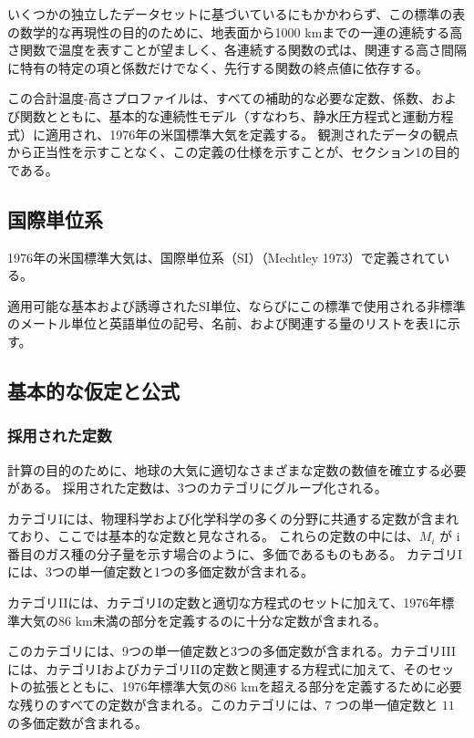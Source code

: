 \documentclass{article}
\begin{document}
いくつかの独立したデータセットに基づいているにもかかわらず、この標準の表の数学的な再現性の目的のために、地表面から1000 kmまでの一連の連続する高さ関数で温度を表すことが望ましく、各連続する関数の式は、関連する高さ間隔に特有の特定の項と係数だけでなく、先行する関数の終点値に依存する。

この合計温度-高さプロファイルは、すべての補助的な必要な定数、係数、および関数とともに、基本的な連続性モデル（すなわち、静水圧方程式と運動方程式）に適用され、1976年の米国標準大気を定義する。
観測されたデータの観点から正当性を示すことなく、この定義の仕様を示すことが、セクション1の目的である。

\subsection{国際単位系}

1976年の米国標準大気は、国際単位系（SI）（Mechtley 1973）で定義されている。

適用可能な基本および誘導されたSI単位、ならびにこの標準で使用される非標準のメートル単位と英語単位の記号、名前、および関連する量のリストを表1に示す。

\subsection{基本的な仮定と公式}
\subsubsection{採用された定数}

計算の目的のために、地球の大気に適切なさまざまな定数の数値を確立する必要がある。
採用された定数は、3つのカテゴリにグループ化される。

カテゴリIには、物理科学および化学科学の多くの分野に共通する定数が含まれており、ここでは基本的な定数と見なされる。
これらの定数の中には、$M_i$ が i 番目のガス種の分子量を示す場合のように、多価であるものもある。
カテゴリIには、3つの単一値定数と1つの多価定数が含まれる。

カテゴリIIには、カテゴリIの定数と適切な方程式のセットに加えて、1976年標準大気の86 km未満の部分を定義するのに十分な定数が含まれる。

このカテゴリには、9つの単一値定数と3つの多価定数が含まれる。カテゴリIIIには、カテゴリIおよびカテゴリIIの定数と関連する方程式に加えて、そのセットの拡張とともに、1976年標準大気の86 kmを超える部分を定義するために必要な残りのすべての定数が含まれる。このカテゴリには、$7$ つの単一値定数と $11$ の多価定数が含まれる。
\end{document}
